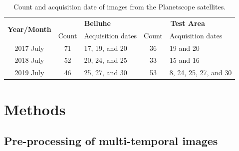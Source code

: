 \documentclass[authoryear,preprint,review,12pt]{elsarticle}
\begin{document}
\begin{table}[ht]
\footnotesize
\caption{Count and acquisition date of images from the Planetscope satellites.}
\label{table_image_list}
\centering
\begin{tabular}{c  c  m{2.5cm}   c m{3.0cm} }
\toprule
 \multirow{2}{*}{ \textbf{Year/Month}}  & \multicolumn{2}{c}{ \textbf{Beiluhe}} &  \multicolumn{2}{c}{ \textbf{Test Area}}\\
 & Count & Acquisition dates & Count & Acquisition dates \\
\midrule
 2017 July & 71 & 17, 19, and 20 & 36 & 19 and 20 \\
 2018 July & 52 & 20, 24, and 25 & 33 & 15 and 16 \\
 2019 July & 46 & 25, 27, and 30 & 53 &  8, 24, 25, 27, and 30\\

\bottomrule
\end{tabular}

\end{table}


\section{Methods}
\label{sec_meth}



\subsection{Pre-processing of multi-temporal images}
\label{sec_preprocessing}
\end{document}
